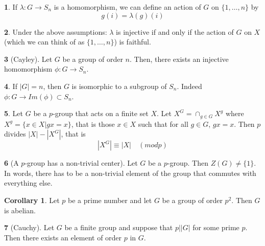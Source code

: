 \documentclass[12pt]{article}
\theoremstyle{definition}
\newtheorem{theorem}{\color{ForestGreen}{\textbf{Theorem}}}
\newtheorem{corollary}{Corollary}
\begin{document}
\begin{theorem}
If $\lambda : G \to S_n$ is a homomorphism, we can define an action of $G$ on $\{1,\ldots, n\}$ by
\begin{equation}
g(i) = \lambda(g)(i)
\end{equation}
\end{theorem}

\begin{theorem}
Under the above assumptions: $\lambda$ is injective if and only if the action of $G$ on $X$ (which we can think of as $\{1,\ldots, n\}$) is faithful.
\end{theorem}

\begin{theorem}[Cayley]
Let $G$ be a group of order $n$. Then, there exists an injective homomorphism $\phi : G \to S_n$.
\end{theorem}

\begin{theorem}
If $|G| = n$, then $G$ is isomorphic to a subgroup of $S_n$. Indeed $\phi : G \to Im(\phi) \subset S_n$.
\end{theorem}

\begin{theorem}
Let $G$ be a $p$-group that acts on a finite set $X$. Let $X^G = \cap_{g \in G} X^g$ where $X^g = \{x\in X| gx =x\}$, that is those $x\in X$ such that for all $g\in G$, $gx = x$. Then $p$ divides $|X| - |X^G|$, that is
\begin{equation}
|X^G| \equiv |X| \quad (mod p)
\end{equation}
\end{theorem}

\begin{theorem}[A $p$-group has a non-trivial center]
Let $G$ be a $p$-group. Then $Z(G) \neq \{1\}$.  In words, there has to be a non-trivial element of the group that commutes with everything else.
\end{theorem}

\begin{corollary}
Let $p$ be a prime number and let $G$ be a group of order $p^2$. Then $G$ is abelian.
\end{corollary}

\begin{theorem}[Cauchy]
Let $G$ be a finite group and suppose that $p \big\vert |G|$ for some prime $p$. Then there exists an element of order $p$ in $G$.
\end{theorem}
\end{document}
